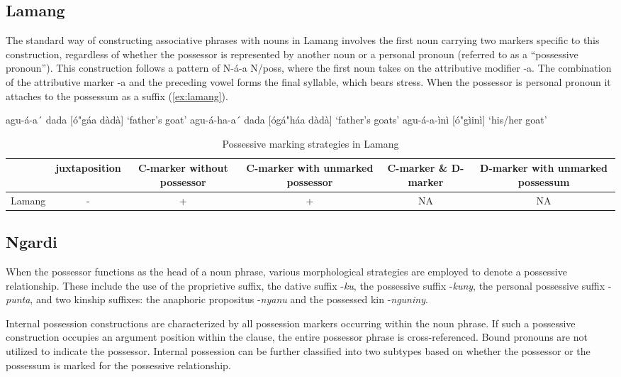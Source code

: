 \subsection{Lamang}

The standard way of constructing associative phrases with nouns in Lamang involves the first noun carrying two markers specific to this construction, regardless of whether the possessor is represented by another noun or a personal pronoun (referred to as a ``possessive pronoun''). This construction follows a pattern of N-á-a N/poss, where the first noun takes on the attributive modifier {-a}. The combination of the attributive marker {-a} and the preceding vowel forms the final syllable, which bears stress. When the possessor is personal pronoun it attaches to the possessum as a suffix (\ref{ex:lamang}).

\pex\label{ex:lamang}
\a *agu-á-a´ dada [ó"gáa dàdà] `father's goat'
\a *agu-á-ha-a´ dada [ógá"háa dàdà] `father's goats'
\a *agu-á-a-ìnì [ó"gìinì] `his/her goat'
\xe


\begin{table}[h!]
	\centering
	\small
	\begin{tabular}{@{}cccccc@{}}
		\toprule
		& juxtaposition & \parbox{2.5cm}{C-marker without possessor} & \parbox{2.75cm}{C-marker with unmarked possessor} & \parbox{1.75cm}{C-marker \& D-marker} & \parbox{3cm}{D-marker with unmarked possessum} \\ \midrule
		Lamang & - & + & + & NA & NA \\ \bottomrule
	\end{tabular}
	\caption{Possessive marking strategies in Lamang}
\end{table}

\subsection{Ngardi}

When the possessor functions as the head of a noun phrase, various morphological strategies are employed to denote a possessive relationship. These include the use of the proprietive suffix, the dative suffix -\textit{ku}, the possessive suffix -\textit{kuny}, the personal possessive suffix -\textit{punta}, and two kinship suffixes: the anaphoric propositus -\textit{nyanu} and the possessed kin -\textit{nguniny}.

Internal possession constructions are characterized by all possession markers occurring within the noun phrase. If such a possessive construction occupies an argument position within the clause, the entire possessor phrase is cross-referenced. Bound pronouns are not utilized to indicate the possessor. Internal possession can be further classified into two subtypes based on whether the possessor or the possessum is marked for the possessive relationship.

